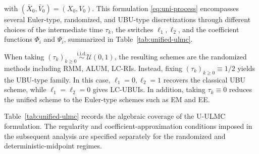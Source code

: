 \documentclass[12pt]{article}
\newenvironment{redtext}
  {\color{black}\ignorespaces}
  {\ignorespacesafterend}
\numberwithin{equation}{section}
\begin{document}
\begin{redtext}
with $(\bar X_0, \bar V_0)=(X_0, V_0)$. This formulation \eqref{eq:uni-process} encompasses several
Euler-type, randomized, and UBU-type discretizations through different
choices of the intermediate time $\tau_k$, the switches
$\ell_1,\ell_2$, and the coefficient functions $\Phi_i$ and $\Psi_i$, summarized in
Table~\ref{tab:unified-ulmc}. %

When taking $(\tau_k)_{k\ge 0}\overset{\text{i.i.d.}}{\sim}\mathcal U(0,1)$,
the resulting schemes are the randomized methods including RMM, ALUM, LC-RIs. Instead, fixing $(\tau_k)_{k\ge 0}\equiv1/2$ yields the UBU-type family. In this case, $\ell_1=0,\ell_2=1$ recovers
the classical UBU scheme, while $\ell_1=\ell_2=0$ gives LC-UBUIs. 
In addition, taking $\tau_k \equiv 0$ reduces the unified scheme to the Euler-type schemes such as EM and EE.

Table~\ref{tab:unified-ulmc} records the algebraic coverage of the
U-ULMC formulation. The regularity and coefficient-approximation
conditions imposed in the subsequent analysis are specified separately
for the randomized and deterministic-midpoint regimes.
\end{redtext}
\end{document}
